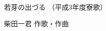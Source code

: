 \documentclass[10pt,b5j]{tarticle} %
\begin{document}
\begin{minipage}[c]{0.7\hsize} %
    \begin{center}
        {\LARGE
            若芽の出づる %
        }
        {\small 
            （平成3年度寮歌） %
        }
    \end{center}
\end{minipage}
\begin{minipage}[c]{0.3\hsize} %
    \begin{flushright} %
        柴田一君 作歌・作曲 %
    \end{flushright}
\end{minipage}
\end{document}
